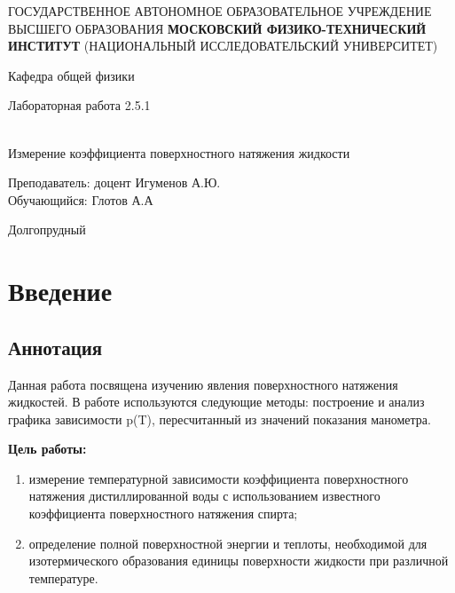 \documentclass[12pt,a4paper]{article}
\author{Глотов Алексей}
\begin{document}
\newpage
\begin{center}
\footnotesize{{ГОСУДАРСТВЕННОЕ АВТОНОМНОЕ ОБРАЗОВАТЕЛЬНОЕ УЧРЕЖДЕНИЕ}\break
{ВЫСШЕГО ОБРАЗОВАНИЯ}
\break
{\bf {МОСКОВСКИЙ ФИЗИКО-ТЕХНИЧЕСКИЙ ИНСТИТУТ}}
\break
\small{(НАЦИОНАЛЬНЫЙ ИССЛЕДОВАТЕЛЬСКИЙ УНИВЕРСИТЕТ)}}
\break
\hfill \break
\hfill \break
\begin{center}
\normalsize{Кафедра общей физики}
\end{center}
\hfill \break
\hfill \break
\hfill \break
\hfill \break

\begin{center}
\normalsize {Лабораторная работа 2.5.1}
\end{center}
\hfill \break\\
\large{Измерение коэффициента поверхностного натяжения жидкости}
\end{center}
\begin{flushleft}
\hfill \break
\hfill \break
\hfill \break
\hfill \break
\hfill \break
\hfill \break
\hfill \break
\hfill \break
\hfill \break
\hfill \break
\hangindent=9cm
\normalsize{Преподаватель:}\hfill
\normalsize{доцент Игуменов А.Ю.}\\
\hfill \break
\normalsize{Обучающийся:}\hfill
\normalsize{Глотов А.А} \\
\hfill \break
\end{flushleft}
\hfill \break
\hfill \break
\hfill \break
\hfill \break
\hfill \break
\hfill \break
\hfill \break
\hfill \break
\hfill \break
\hfill \break
\hfill \break

\begin{center}
Долгопрудный 
\end{center}
\thispagestyle{empty}
\newpage
\section{Введение}

\subsection{Аннотация}

Данная работа посвящена изучению явления поверхностного натяжения жидкостей. В работе используются следующие методы: построение и анализ графика зависимости p(T), пересчитанный из значений показания манометра.


\textbf{Цель работы:}  \begin{enumerate}
	\item измерение температурной зависимости  коэффициента поверхностного натяжения дистиллированной воды с использованием известного коэффициента поверхностного натяжения спирта;
	\item определение полной поверхностной энергии  и теплоты, необходимой для изотермического образования единицы  поверхности жидкости  при различной температуре.
\end{enumerate}
\end{document}
